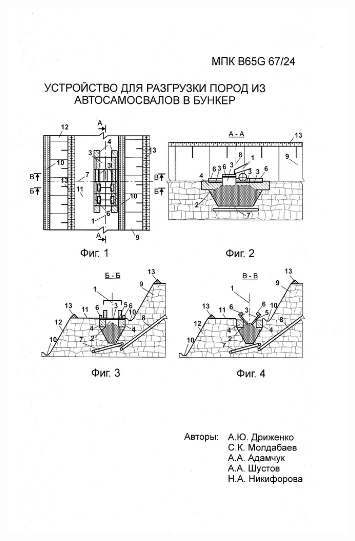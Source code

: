 \begin{figure}[H]
	\centering
	\includegraphics[width=0.8\textwidth]{assets/1353}
	\caption*{}
\end{figure}

